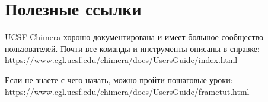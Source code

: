 \section{Полезные ссылки}
UCSF Chimera хорошо документирована и имеет большое сообщество пользователей.
Почти все команды и инструменты описаны в справке: \href{https://www.cgl.ucsf.edu/chimera/docs/UsersGuide/index.html}{https://www.cgl.ucsf.edu/chimera/docs/UsersGuide/index.html}

Если не знаете с чего начать, можно пройти пошаговые уроки:\\
\href{https://www.cgl.ucsf.edu/chimera/docs/UsersGuide/frametut.html}{https://www.cgl.ucsf.edu/chimera/docs/UsersGuide/frametut.html}
